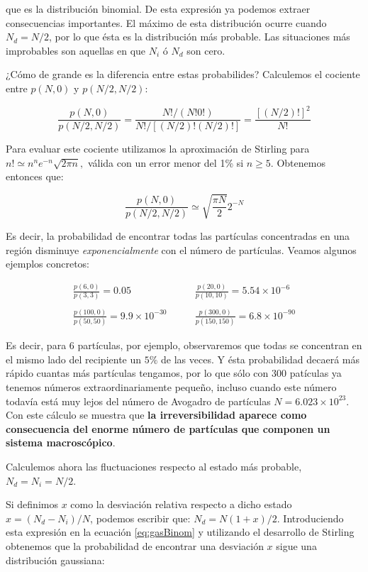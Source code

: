 \documentclass[11pt, a4paper]{article} %
\theoremstyle{named}
\begin{document}
que es la distribución binomial. De esta expresión ya podemos extraer consecuencias importantes. El máximo de esta distribución ocurre cuando $N_d = N/2$, por lo que ésta es la distribución más probable. Las situaciones más improbables son aquellas en que $N_i$ ó $N_d$ son cero.

¿Cómo de grande es la diferencia entre estas probabilides? Calculemos el cociente entre $p(N, 0)$ y $p(N / 2, N / 2)$:

\begin{equation}
\frac{p(N, 0)}{p(N / 2, N / 2)}=\frac{N ! /(N ! 0 !)}{N ! /[(N / 2) !(N / 2) !]}=\frac{[(N / 2) !]^{2}}{N !}
\end{equation}

Para evaluar este cociente utilizamos la aproximación de Stirling para $n ! \simeq n^{n} e^{-n} \sqrt{2 \pi n},$ válida con un error menor del 1\% si $n \geq 5$. Obtenemos entonces que:

\begin{equation}
\frac{p(N, 0)}{p(N / 2, N / 2)} \simeq \sqrt{\frac{\pi N}{2}} 2^{-N}
\end{equation}

Es decir, la probabilidad de encontrar todas las partículas concentradas en una región disminuye \textit{exponencialmente} con el número de partículas. Veamos algunos ejemplos concretos:

$$
\begin{array}{lr}
\frac{p(6,0)}{p(3,3)} = 0.05 \qquad &
\frac{p(20,0)}{p(10,10)} = 5.54\times10^{-6} \\ \\
\frac{p(100,0)}{p(50,50)} = 9.9\times10^{-30} \qquad &
\frac{p(300,0)}{p(150,150)} = 6.8\times10^{-90}
\end{array}
$$

Es decir, para $6$ partículas, por ejemplo, observaremos que todas se concentran en el mismo lado del recipiente un $5\%$ de las veces. Y ésta probabilidad decaerá más rápido cuantas más partículas tengamos, por lo que sólo con $300$ patículas ya tenemos números extraordinariamente pequeño, incluso cuando este número todavía está muy lejos del número de Avogadro de partículas $N=6.023 \times 10^{23}$. Con este cálculo se muestra que \textbf{la irreversibilidad aparece como consecuencia del enorme número de partículas que componen un sistema macroscópico}.

Calculemos ahora las fluctuaciones respecto al estado más probable, $N_{d}=N_{i}=N / 2$.

Si definimos $x$ como la desviación relativa respecto a dicho estado  $x=\left(N_{d}-N_{i}\right) / N$, podemos escribir que: $N_{d}=N(1+x) / 2$. Introduciendo esta expresión en la ecuación \eqref{eq:gasBinom} y utilizando el desarrollo de Stirling obtenemos que la probabilidad de encontrar una desviación $x$ sigue una distribución gaussiana:
\end{document}
